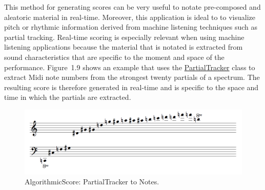 This method for generating scores can be very useful to notate pre-composed and aleatoric material in real-time. Moreover, this application is ideal to to visualize pitch or rhythmic information derived from machine listening techniques such as partial tracking. Real-time scoring is especially relevant when using machine listening applications because the material that is notated is extracted from sound characteristics that are specific to the moment and space of the performance. \mbox{Figure 1.9} shows an example that uses the \hyperlink{partrack}{PartialTracker} class to extract Midi note numbers from the strongest twenty partials of a spectrum. The resulting score is therefore generated in real-time and is specific to the space and time in which the partials are extracted.
\begin{figure}[htbp] %
   \centering
   \includegraphics[width=17cm]{Chapter6/algoScore_partials.tif} %
   \caption{AlgorithmicScore: PartialTracker to Notes.}
   \label{fig:example}
\end{figure}\

